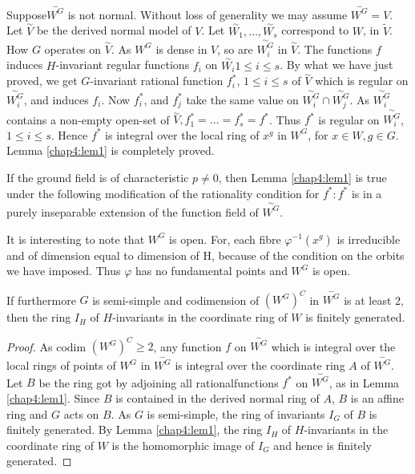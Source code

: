  Suppose\pageoriginale $\overset{-}{W^G}$ is not normal. Without loss
 of generality 
 we may assume $\overset{-}{W^G} = V$. Let $\overset{\sim}{V}$ be the
 derived normal model of $V$. Let $\overset{\sim}{W_1}, \ldots ,
 \overset{\sim}{W_s}$ correspond to $W$, in $\tilde{V}$. How $G$ operates on
 $\overset{\sim}{V}$. As $W^G$ is dense in $V$, so are
 $\overset{\sim}{W_{i}^{G}}$ in $\overset{\sim}{V}$. The functions $f$
 induces $H$-invariant regular functions $f_i $ on
 $\overset{\sim}{W_i} 1
 \leq i \leq s$. By what we have just proved, we get $G$-invariant
 rational function $f_{i}^{\ast}$, $1 \leq i \leq s$ of
 $\overset{\sim}{V}$ which is regular on $\overset{\sim}{W_{i}^{G}}$,
 and induces $f_i$. Now $f_{i}^{\ast}$, and $f_{j}^{\ast}$ take the
 same value on $\overset{\sim}{W_{i}^{G}} \cap
 \overset{\sim}{W_{j}^{G}}$. As $\overset{\sim}{W_{i}^{G}}$ contains a
 non-empty open-set of $\overset{\sim}{V}, f_{1}^{\ast} = \ldots =
 f_{s}^{\ast} = f^\ast $. Thus $f^*$ is regular on
 $\overset{\sim}{W_{i}^{G}}$, $1 \leq i \leq s$. Hence $f^*$ is integral
 over the local ring of $x^g$ in $W^G$, for $x \in W, g \in G$. Lemma
 \ref{chap4:lem1} is completely proved. 

\setcounter{rem}{0}
\begin{rem}%
  If the ground field is of characteristic $p \ne 0$, then Lemma
  \ref{chap4:lem1} 
  is true under the following modification of the rationality
  condition for $f^* : f^*$ is in a purely inseparable extension of
  the function field of $\overset{\sim}{W^G}$.  
\end{rem}

\begin{rem}%
  It is interesting to note that $W^G$ is open. For, each fibre 
  $\varphi^{-1}(x^g)$ is irreducible and of dimension equal to
  dimension of H, because of the condition on the orbits we have
  imposed. Thus $\varphi$ has no fundamental points and $W^G$ is
  open. 
\end{rem}

\begin{coro*}
  If furthermore $G$ is semi-simple and codimension of ${(W^G)}^C$ in
  $\overset{-}{W^G}$ is at least 2, then the ring $I_H$ of
  $H$-invariants in the coordinate ring of $W$ is finitely generated.  
\end{coro*}

\begin{proof}
  As codim ${(W^G)}^C \ge 2$, any function $f$ on $\overset{-}{W^G}$
  which is integral over the local rings of points of $W^G$ in
  $\overset{-}{W^G}$ is integral over the coordinate ring $A$ of
  $\overset{-}{W^G}$. Let $B$ be the ring got by adjoining all
  rational\pageoriginale functions $f^*$ on $\overset{-}{W^G}$, as in
  Lemma  \ref{chap4:lem1}. Since $B$ is contained in the derived
  normal ring of $A$, 
  $B$ is an affine ring and $G$ acts on $B$. As $G$ is semi-simple,
  the ring of invariants $I_G$ of $B$ is finitely generated. By Lemma
   \ref{chap4:lem1}, the ring $I_H$ of $H$-invariants in the
   coordinate ring of $W$ is the homomorphic image of $I_G$ and hence
   is finitely generated.     
\end{proof}

